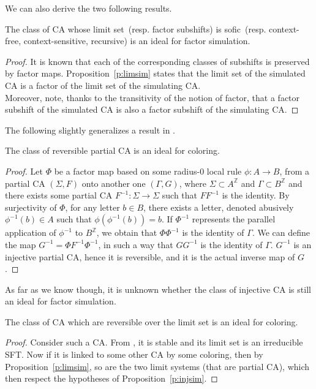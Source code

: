 \documentclass{jac}
\newcommand{\resp}[1]{\ (resp. #1)}
\newcommand{\Z}{\mathbb Z}
\newcommand{\az}{{A^\Z}}
\theoremstyle{definition}
\begin{document}
We can also derive the two following results.
\begin{prop}The class of CA whose limit set\resp{factor subshifts} is sofic\resp{context-free, context-sensitive,
recursive} is an ideal for factor simulation.
\end{prop}
\begin{proof}
It is known that each of the corresponding classes of subshifts is preserved by factor maps.
Proposition~\ref{p:limsim} states that the limit set of the simulated CA is a factor of the limit set of the simulating CA.\\
Moreover, note, thanks to the transitivity of the notion of factor, that a factor subshift of the simulated CA is also a factor subshift of the simulating CA.
\end{proof}



The following slightly generalizes a result in \cite{theyssier}.
\begin{prop}\label{p:injsim}
The class of reversible partial CA is an ideal for coloring.
\end{prop}
\begin{proof}
Let $\Phi$ be a factor map based on some radius-$0$ local rule $\phi:A\to B$, from a partial CA $(\Sigma,F)$ onto another one $(\Gamma,G)$, where $\Sigma\subset\az$ and $\Gamma\subset B^\Z$ and there exists some partial CA $F^{-1}:\Sigma\to\Sigma$ such that $FF^{-1}$ is the identity.
By surjectivity of $\Phi$, for any letter $b\in B$, there exists a letter, denoted abusively $\phi^{-1}(b)\in A$ such that $\phi(\phi^{-1}(b))=b$. If $\Phi^{-1}$ represents the parallel application of $\phi^{-1}$ to $B^\Z$, we obtain that $\Phi\Phi^{-1}$ is the identity of $\Gamma$.
We can define the map $G^{-1}=\Phi F^{-1}\Phi^{-1}$, in such a way that $GG^{-1}$ is the identity of $\Gamma$. $G^{-1}$ is an injective partial CA, hence it is reversible, and it is the actual inverse map of $G$.
\end{proof}
As far as we know though, it is unknown whether the class of injective CA is still an ideal for factor simulation.
\begin{cor}
The class of CA which are reversible over the limit set is an ideal for coloring.
\end{cor}
\begin{proof}Consider such a CA.
From \cite{revlim}, it is stable and its limit set is an irreducible SFT.
Now if it is linked to some other CA by some coloring, then by Proposition~\ref{p:limsim}, so are the two limit systems (that are partial CA), which then respect the hypotheses of Proposition~\ref{p:injsim}.
\end{proof}
\end{document}
